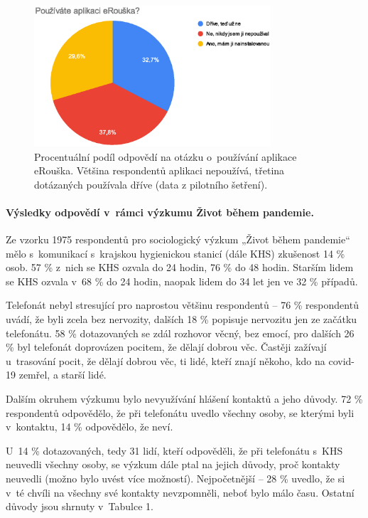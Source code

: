 \begin{figure}[h!]
\begin{center}
    \includegraphics[width=250pt]{./pic/graf3.eps}
 \end{center}    
\caption{Procentuální podíl odpovědí na otázku o~používání aplikace eRouška. Většina respondentů aplikaci nepoužívá, třetina dotázaných používala dříve  (data z pilotního šetření).}
 \end{figure}
 
\pagebreak
\paragraph* {Výsledky odpovědí v~rámci výzkumu Život během pandemie.}
Ze vzorku 1975 respondentů pro sociologický výzkum „Život během pandemie“ mělo s~komunikací s~krajskou hygienickou stanicí (dále KHS) zkušenost 14 \% osob. 57 \% z~nich se KHS ozvala do 24 hodin, 76 \% do 48 hodin. Starším lidem se KHS ozvala v~68 \% do 24 hodin, naopak lidem do 34 let jen ve 32 \% případů. 

Telefonát nebyl stresující pro naprostou většinu respondentů -- 76 \% respondentů uvádí, že byli zcela bez nervozity, dalších 18 \% popisuje nervozitu jen ze začátku telefonátu. 58 \% dotazovaných se zdál rozhovor věcný, bez emocí, pro dalších 26 \% byl telefonát doprovázen pocitem, že dělají dobrou věc. Častěji zažívají u~trasování pocit, že dělají dobrou věc, ti lidé, kteří znají někoho, kdo na covid-19 zemřel, a starší lidé.

Dalším okruhem výzkumu bylo nevyužívání hlášení kontaktů a jeho důvody. 72 \% respondentů odpovědělo, že při telefonátu uvedlo všechny osoby, se kterými byli v~kontaktu, 14 \% odpovědělo, že neví. 

U~14 \% dotazovaných, tedy 31 lidí, kteří odpověděli, že při telefonátu s~KHS neuvedli všechny osoby, se výzkum dále ptal na jejich důvody, proč kontakty neuvedli (možno bylo uvést více možností). Nejpočetnější -- 28 \% uvedlo, že si v~té chvíli na všechny své kontakty nevzpomněli, neboť bylo málo času. Ostatní důvody jsou shrnuty v~Tabulce 1.

